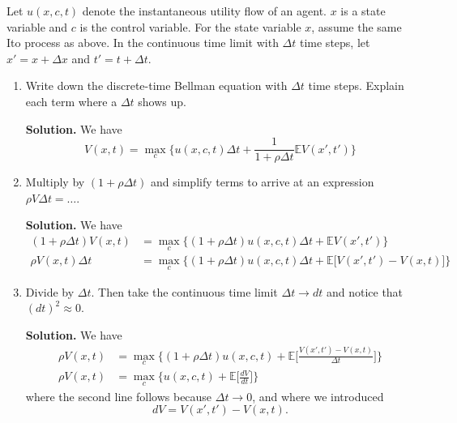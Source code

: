 \documentclass[11pt]{extarticle}
\theoremstyle{plain}
\theoremstyle{definition}
\begin{document}
Let $u(x, c, t)$ denote the instantaneous utility flow of an agent. $x$ is a state variable and $c$ is the control variable. For the state variable $x$, assume the same Ito process as above. In the continuous time limit with $\Delta t$ time steps, let $x' = x + \Delta x$ and $t' = t + \Delta t$.

\begin{enumerate}
\item Write down the discrete-time Bellman equation with $\Delta t$ time steps. Explain each term where a $\Delta t$ shows up. 

\vspace{5mm}
\noindent
\textbf{Solution.} We have
\begin{equation*}
	V(x, t) = \max_c \bigg\{ u(x, c, t) \Delta t + \frac{1}{1 + \rho \Delta t} \mathbb E V(x', t') \bigg\}
\end{equation*}


\item Multiply by $(1 + \rho \Delta t)$ and simplify terms to arrive at an expression $\rho V \Delta t = \ldots$. 

\vspace{5mm}
\noindent
\textbf{Solution.} We have
\begin{align*}
	(1 + \rho \Delta t) V(x, t) &= \max_c \bigg\{ (1 + \rho \Delta t) u(x, c, t) \Delta t + \mathbb E V(x', t') \bigg\} \\
	\rho V(x, t) \Delta t &= \max_c \bigg\{ (1 + \rho \Delta t) u(x, c, t) \Delta t + \mathbb E \bigg[ V(x', t') - V(x, t) \bigg] \bigg\}
\end{align*}


\item Divide by $\Delta t$. Then take the continuous time limit $\Delta t \to dt$ and notice that $(dt)^2 \approx 0$. 

\vspace{5mm}
\noindent
\textbf{Solution.} We have
\begin{align*}
	\rho V(x, t) &= \max_c \bigg\{ (1 + \rho \Delta t) u(x, c, t) + \mathbb E \bigg[ \frac{V(x', t') - V(x, t)}{\Delta t} \bigg] \bigg\} \\
	\rho V(x, t) &= \max_c \bigg\{ u(x, c, t) + \mathbb E \bigg[ \frac{dV}{dt} \bigg] \bigg\}
\end{align*}
where the second line follows because $\Delta t \to 0$, and where we introduced
\begin{equation*}
	dV = V(x', t') - V(x, t).
\end{equation*}



\end{enumerate}
\end{document}
